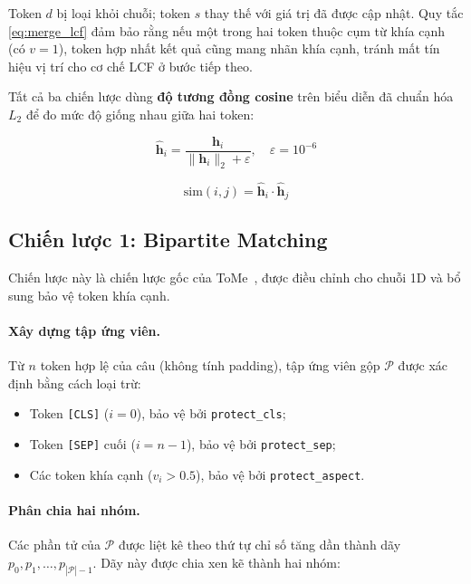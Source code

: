 Token $d$ bị loại khỏi chuỗi; token $s$ thay thế với giá trị đã được
cập nhật.  Quy tắc \eqref{eq:merge_lcf} đảm bảo rằng nếu một trong
hai token thuộc cụm từ khía cạnh (có $v = 1$), token hợp nhất kết quả
cũng mang nhãn khía cạnh, tránh mất tín hiệu vị trí cho cơ chế LCF
ở bước tiếp theo.

Tất cả ba chiến lược dùng \textbf{độ tương đồng cosine} trên biểu
diễn đã chuẩn hóa $L_2$ để đo mức độ giống nhau giữa hai token:

\begin{equation}
  \hat{\mathbf{h}}_i = \frac{\mathbf{h}_i}{\|\mathbf{h}_i\|_2 + \varepsilon},
  \quad \varepsilon = 10^{-6}
  \label{eq:l2norm}
\end{equation}

\begin{equation}
  \mathrm{sim}(i, j) = \hat{\mathbf{h}}_i \cdot \hat{\mathbf{h}}_j
  \label{eq:cosine}
\end{equation}

\subsection{Chiến lược 1: Bipartite Matching}
\label{subsec:bipartite}

Chiến lược này là chiến lược gốc của ToMe~\cite{bolya2023tome}, được
điều chỉnh cho chuỗi 1D và bổ sung bảo vệ token khía cạnh.

\paragraph{Xây dựng tập ứng viên.}
Từ $n$ token hợp lệ của câu (không tính padding), tập ứng viên gộp
$\mathcal{P}$ được xác định bằng cách loại trừ:
\begin{itemize}
  \item Token \texttt{[CLS]} ($i = 0$), bảo vệ bởi \texttt{protect\_cls};
  \item Token \texttt{[SEP]} cuối ($i = n-1$), bảo vệ bởi
    \texttt{protect\_sep};
  \item Các token khía cạnh ($v_i > 0.5$), bảo vệ bởi
    \texttt{protect\_aspect}.
\end{itemize}

\paragraph{Phân chia hai nhóm.}
Các phần tử của $\mathcal{P}$ được liệt kê theo thứ tự chỉ số tăng
dần thành dãy $p_0, p_1, \dots, p_{|\mathcal{P}|-1}$.  Dãy này được
chia xen kẽ thành hai nhóm:


